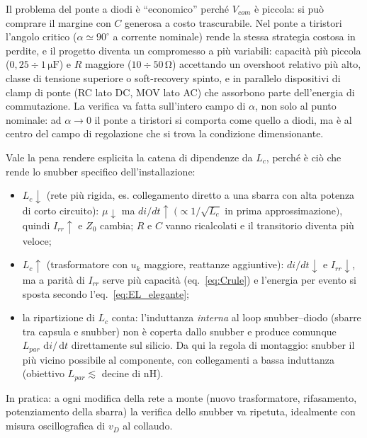 \documentclass[11pt,a4paper]{article}
\newcommand{\ud}{\,\mathrm{d}}
\newcommand{\unit}[1]{\,\mathrm{#1}}
\begin{document}
Il problema del ponte a diodi \`e ``economico'' perch\'e $V_{com}$ \`e
piccola: si pu\`o comprare il margine con $C$ generosa a costo
trascurabile. Nel ponte a tiristori l'angolo critico
($\alpha\simeq90^\circ$ a corrente nominale) rende la stessa strategia
costosa in perdite, e il progetto diventa un compromesso a pi\`u
variabili: capacit\`a pi\`u piccola ($0{,}25\div1\unit{\mu F}$) e $R$
maggiore ($10\div50\unit{\Omega}$) accettando un overshoot relativo pi\`u
alto, classe di tensione superiore o soft-recovery spinto, e in
parallelo dispositivi di clamp di ponte (RC lato DC, MOV lato AC) che
assorbono parte dell'energia di commutazione. La verifica va fatta
sull'intero campo di $\alpha$, non solo al punto nominale: ad
$\alpha\to0$ il ponte a tiristori si comporta come quello a diodi, ma
\`e al centro del campo di regolazione che si trova la condizione
dimensionante.


\label{sec:sensibilita}

Vale la pena rendere esplicita la catena di dipendenze da $L_c$, perch\'e
\`e ci\`o che rende lo snubber specifico dell'installazione:
\begin{itemize}
\item $L_c \downarrow$ (rete pi\`u rigida, es. collegamento diretto a una
sbarra con alta potenza di corto circuito): $\mu\downarrow$ ma
$di/dt \uparrow \;(\propto 1/\sqrt{L_c}$ in prima approssimazione$)$,
quindi $I_{rr}\uparrow$ e $Z_0$ cambia; $R$ e $C$ vanno ricalcolati e il
transitorio diventa pi\`u veloce;
\item $L_c \uparrow$ (trasformatore con $u_k$ maggiore, reattanze
aggiuntive): $di/dt\downarrow$ e $I_{rr}\downarrow$, ma a parit\`a di
$I_{rr}$ serve pi\`u capacit\`a (eq.~\ref{eq:Crule}) e l'energia per
evento si sposta secondo l'eq.~\eqref{eq:EL_elegante};
\item la ripartizione di $L_c$ conta: l'induttanza \emph{interna} al
loop snubber--diodo (sbarre tra capsula e snubber) non \`e coperta dallo
snubber e produce comunque $L_{par}\,\ud i/\ud t$ direttamente sul
silicio. Da qui la regola di montaggio: snubber il pi\`u vicino possibile
al componente, con collegamenti a bassa induttanza (obiettivo
$L_{par} \lesssim$ decine di nH).
\end{itemize}
In pratica: a ogni modifica della rete a monte (nuovo trasformatore,
rifasamento, potenziamento della sbarra) la verifica dello snubber va
ripetuta, idealmente con misura oscillografica di $v_D$ al collaudo.

\end{document}
